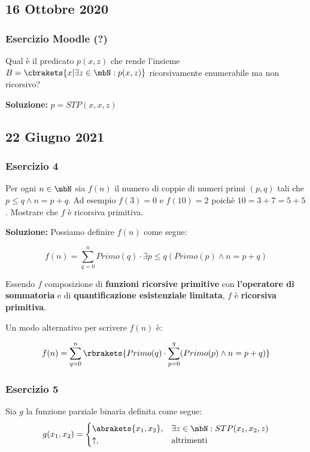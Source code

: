 \subsection{16 Ottobre 2020}

\subsubsection{Esercizio Moodle (?)}

Qual è il predicato \(p(x,z)\) che rende l'insieme \(B=\cbrakets{x \vert \exists z \in \mbN: p(x,z)}\) ricorsivamente enumerabile ma non ricorsivo?

\textbf{Soluzione: } \(p=STP(x,x,z)\)

\subsection{22 Giugno 2021}

\subsubsection{Esercizio 4}

Per ogni \(n \in \mbN\) sia \(f(n)\) il numero di coppie di numeri primi \((p,q)\) tali che \(p\leq q \land n=p+q\). Ad esempio \(f(3)=0\) e \(f(10)=2\) poichè \(10=3+7=5+5\). Mostrare che \(f\) è ricorsiva primitiva.

\textbf{Soluzione: } Possiamo definire \(f(n)\) come segue:

\begin{equation}
  f(n) = \sum_{q=0}^{n} Primo(q) \cdot \exists p \leq q (Primo(p) \land n=p+q)
\end{equation}

Essendo \(f\) composizione di \textbf{funzioni ricorsive primitive} con \textbf{l'operatore di sommatoria} e di \textbf{quantificazione esistenziale limitata}, \(f\) è \textbf{ricorsiva primitiva}.

Un modo alternativo per scrivere \(f(n)\) è:

\begin{equation}
  f(n) = \sum_{q=0}^{n} \rbrakets{Primo(q) \cdot \sum_{p=0}^q (Primo(p) \land n=p+q)}
\end{equation}

\subsubsection{Esercizio 5}

Sia \(g\) la funzione parziale binaria definita come segue:
\begin{equation}
  g(x_1, x_2) = \begin{cases}
    \abrakets{x_1,x_2}, & \exists z \in \mbN: STP(x_1,x_2,z)\\
    \uparrow, & \text{altrimenti}
  \end{cases}
\end{equation}

